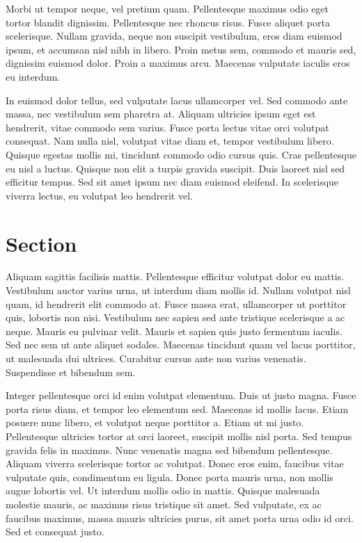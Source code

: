 Morbi ut tempor neque, vel pretium quam. Pellentesque maximus odio eget tortor blandit dignissim. Pellentesque nec rhoncus risus. Fusce aliquet porta scelerisque. Nullam gravida, neque non suscipit vestibulum, eros diam euismod ipsum, et accumsan nisl nibh in libero. Proin metus sem, commodo et mauris sed, dignissim euismod dolor. Proin a maximus arcu. Maecenas vulputate iaculis eros eu interdum.

In euismod dolor tellus, sed vulputate lacus ullamcorper vel. Sed commodo ante massa, nec vestibulum sem pharetra at. Aliquam ultricies ipsum eget est hendrerit, vitae commodo sem varius. Fusce porta lectus vitae orci volutpat consequat. Nam nulla nisl, volutpat vitae diam et, tempor vestibulum libero. Quisque egestas mollis mi, tincidunt commodo odio cursus quis. Cras pellentesque eu nisl a luctus. Quisque non elit a turpis gravida suscipit. Duis laoreet nisl sed efficitur tempus. Sed sit amet ipsum nec diam euismod eleifend. In scelerisque viverra lectus, eu volutpat leo hendrerit vel.

\section {Section}

Aliquam sagittis facilisis mattis. Pellentesque efficitur volutpat dolor eu mattis. Vestibulum auctor varius urna, ut interdum diam mollis id. Nullam volutpat nisl quam, id hendrerit elit commodo at. Fusce massa erat, ullamcorper ut porttitor quis, lobortis non nisi. Vestibulum nec sapien sed ante tristique scelerisque a ac neque. Mauris eu pulvinar velit. Mauris et sapien quis justo fermentum iaculis. Sed nec sem ut ante aliquet sodales. Maecenas tincidunt quam vel lacus porttitor, ut malesuada dui ultrices. Curabitur cursus ante non varius venenatis. Suspendisse et bibendum sem.

Integer pellentesque orci id enim volutpat elementum. Duis ut justo magna. Fusce porta risus diam, et tempor leo elementum sed. Maecenas id mollis lacus. Etiam posuere nunc libero, et volutpat neque porttitor a. Etiam ut mi justo. Pellentesque ultricies tortor at orci laoreet, suscipit mollis nisl porta. Sed tempus gravida felis in maximus. Nunc venenatis magna sed bibendum pellentesque. Aliquam viverra scelerisque tortor ac volutpat. Donec eros enim, faucibus vitae vulputate quis, condimentum eu ligula. Donec porta mauris urna, non mollis augue lobortis vel. Ut interdum mollis odio in mattis. Quisque malesuada molestie mauris, ac maximus risus tristique sit amet. Sed vulputate, ex ac faucibus maximus, massa mauris ultricies purus, sit amet porta urna odio id orci. Sed et consequat justo.

